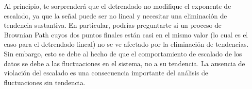 \documentclass[10pt,a4paper]{book}
\begin{document}
\bigskip

Al principio, te sorprenderá que el detrendado no modifique el exponente de escalado, ya que la señal puede ser no lineal y necesitar una eliminación de tendencia sustantiva. En particular, podrías preguntarte si un proceso de Brownian Path cuyos dos puntos finales están casi en el mismo valor (lo cual es el caso para el detrendado lineal) no se ve afectado por la eliminación de tendencias. Sin embargo, esto se debe al hecho de que el comportamiento de escalado de los datos se debe a las fluctuaciones en el sistema, no a su tendencia. La ausencia de violación del escalado es una consecuencia importante del análisis de fluctuaciones sin tendencia.
\end{document}
